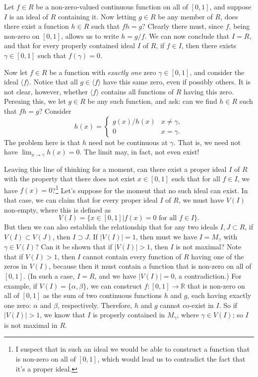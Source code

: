\documentclass[12pt]{article}
\newcommand{\R}{\mathbb{R}}
\begin{document}
Let $f\in R$ be a non-zero-valued continuous function on all of $[0,1]$, and suppose $I$ is an ideal of $R$
containing it.  Now letting $g\in R$ be any member of $R$, does there exist a function $h\in R$ such that
$fh=g$?  Clearly there must, since $f$, being non-zero on $[0,1]$, allows us to write $h=g/f$.
We can now conclude that $I=R$, and that for every properly contained ideal $I$ of $R$, if $f\in I$,
then there exists $\gamma\in[0,1]$ such that $f(\gamma)=0$.

Now let $f\in R$ be a function with {\it exactly one} zero $\gamma\in[0,1]$, and consider the ideal $\langle f\rangle$.
Notice that all $g\in\langle f\rangle$ have this same zero, even if possibly others.
It is not clear, however, whether $\langle f\rangle$ contains all functions of $R$ having this zero.
Persuing this, we let $g\in R$ be any such function, and ask: can we find $h\in R$ such that $fh=g$?  Consider
\begin{equation*}
h(x)=\left\{\begin{array}{ll} g(x)/h(x) & x\neq\gamma, \\ 0 & x=\gamma. \end{array}\right.
\end{equation*}
The problem here is that $h$ need not be continuous at $\gamma$.  That is, we need not have
$\lim_{x\to\gamma} h(x)=0$.  The limit may, in fact, not even exist!

Leaving this line of thinking for a moment, can there exist a proper ideal $I$ of $R$ with the
property that there does not exist $x\in[0,1]$ such that for all $f\in I$, we have $f(x)=0$?\footnote{I suspect that
in such an ideal we would be able to construct a function that is non-zero on all of $[0,1]$, which would lead us to
contradict the fact that it's a proper ideal.}
Let's suppose for the moment that no such ideal can exist.  In that case, we can claim that
for every proper ideal $I$ of $R$, we must have $V(I)$ non-empty, where this is defined as
\begin{equation*}
V(I)=\{x\in[0,1]|\mbox{$f(x)=0$ for all $f\in I$}\}.
\end{equation*}
But then we can also establish the relationship that for any two ideals $I,J\subset R$,
if $V(I)\subset V(J)$, then $I\supset J$.  If $|V(I)|=1$, then must we have $I=M_{\gamma}$
with $\gamma\in V(I)$?  Can it be shown that if $|V(I)|>1$, then $I$ is not maximal?
Note that if $V(I)>1$, then $I$ cannot contain every function of $R$ having one of the zeros in $V(I)$,
because then it must contain a function that is non-zero on all of $[0,1]$.  (In such a case, $I=R$, and we have $|V(I)|=0$,
a contradiction.)  For example, if $V(I)=\{\alpha,\beta\}$, we can construct $f:[0,1]\to\R$ that is non-zero on all of $[0,1]$
as the sum of two continuous functions $h$ and $g$, each having exactly one zero: $\alpha$ and $\beta$, respectively.
Therefore, $h$ and $g$ cannot co-exist in $I$.
So if $|V(I)|>1$, we know that $I$ is properly contained in $M_{\gamma}$, where $\gamma\in V(I)$;
so $I$ is not maximal in $R$.
\end{document}
